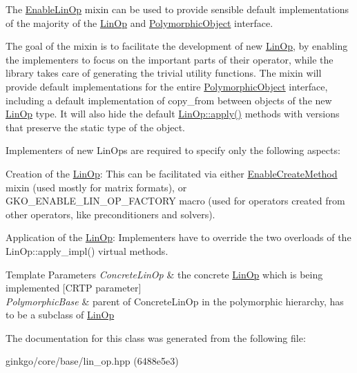 The \hyperlink{classgko_1_1EnableLinOp}{Enable\+Lin\+Op} mixin can be used to provide sensible default implementations of the majority of the \hyperlink{classgko_1_1LinOp}{Lin\+Op} and \hyperlink{classgko_1_1PolymorphicObject}{Polymorphic\+Object} interface. 

The goal of the mixin is to facilitate the development of new \hyperlink{classgko_1_1LinOp}{Lin\+Op}, by enabling the implementers to focus on the important parts of their operator, while the library takes care of generating the trivial utility functions. The mixin will provide default implementations for the entire \hyperlink{classgko_1_1PolymorphicObject}{Polymorphic\+Object} interface, including a default implementation of {\ttfamily copy\+\_\+from} between objects of the new \hyperlink{classgko_1_1LinOp}{Lin\+Op} type. It will also hide the default \hyperlink{classgko_1_1LinOp_a0449b2fc705d2f970855af23b5e2788e}{Lin\+Op\+::apply()} methods with versions that preserve the static type of the object.

Implementers of new Lin\+Ops are required to specify only the following aspects\+:


\begin{DoxyEnumerate}
\item Creation of the \hyperlink{classgko_1_1LinOp}{Lin\+Op}\+: This can be facilitated via either \hyperlink{classgko_1_1EnableCreateMethod}{Enable\+Create\+Method} mixin (used mostly for matrix formats), or G\+K\+O\+\_\+\+E\+N\+A\+B\+L\+E\+\_\+\+L\+I\+N\+\_\+\+O\+P\+\_\+\+F\+A\+C\+T\+O\+RY macro (used for operators created from other operators, like preconditioners and solvers).
\item Application of the \hyperlink{classgko_1_1LinOp}{Lin\+Op}\+: Implementers have to override the two overloads of the Lin\+Op\+::apply\+\_\+impl() virtual methods.
\end{DoxyEnumerate}


\begin{DoxyTemplParams}{Template Parameters}
{\em Concrete\+Lin\+Op} & the concrete \hyperlink{classgko_1_1LinOp}{Lin\+Op} which is being implemented \mbox{[}C\+R\+TP parameter\mbox{]} \\
\hline
{\em Polymorphic\+Base} & parent of Concrete\+Lin\+Op in the polymorphic hierarchy, has to be a subclass of \hyperlink{classgko_1_1LinOp}{Lin\+Op} \\
\hline
\end{DoxyTemplParams}


The documentation for this class was generated from the following file\+:\begin{DoxyCompactItemize}
\item 
ginkgo/core/base/lin\+\_\+op.\+hpp (6488e5e3)\end{DoxyCompactItemize}
